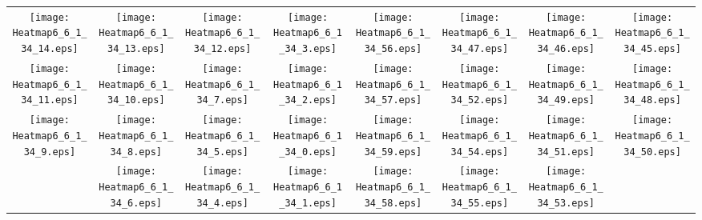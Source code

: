 \documentclass{standalone}
\begin{document}
\begin{tabular}{ *8{c} }
\texttt{[image: Heatmap6\_6\_1\_34\_14.eps]} & \texttt{[image: Heatmap6\_6\_1\_34\_13.eps]} & \texttt{[image: Heatmap6\_6\_1\_34\_12.eps]} & \texttt{[image: Heatmap6\_6\_1\_34\_3.eps]} & \texttt{[image: Heatmap6\_6\_1\_34\_56.eps]} & \texttt{[image: Heatmap6\_6\_1\_34\_47.eps]} & \texttt{[image: Heatmap6\_6\_1\_34\_46.eps]} & \texttt{[image: Heatmap6\_6\_1\_34\_45.eps]} \\
\texttt{[image: Heatmap6\_6\_1\_34\_11.eps]} & \texttt{[image: Heatmap6\_6\_1\_34\_10.eps]} & \texttt{[image: Heatmap6\_6\_1\_34\_7.eps]} & \texttt{[image: Heatmap6\_6\_1\_34\_2.eps]} & \texttt{[image: Heatmap6\_6\_1\_34\_57.eps]} & \texttt{[image: Heatmap6\_6\_1\_34\_52.eps]} & \texttt{[image: Heatmap6\_6\_1\_34\_49.eps]} & \texttt{[image: Heatmap6\_6\_1\_34\_48.eps]} \\
\texttt{[image: Heatmap6\_6\_1\_34\_9.eps]} & \texttt{[image: Heatmap6\_6\_1\_34\_8.eps]} & \texttt{[image: Heatmap6\_6\_1\_34\_5.eps]} & \texttt{[image: Heatmap6\_6\_1\_34\_0.eps]} & \texttt{[image: Heatmap6\_6\_1\_34\_59.eps]} & \texttt{[image: Heatmap6\_6\_1\_34\_54.eps]} & \texttt{[image: Heatmap6\_6\_1\_34\_51.eps]} & \texttt{[image: Heatmap6\_6\_1\_34\_50.eps]} \\
 & \texttt{[image: Heatmap6\_6\_1\_34\_6.eps]} & \texttt{[image: Heatmap6\_6\_1\_34\_4.eps]} & \texttt{[image: Heatmap6\_6\_1\_34\_1.eps]} & \texttt{[image: Heatmap6\_6\_1\_34\_58.eps]} & \texttt{[image: Heatmap6\_6\_1\_34\_55.eps]} & \texttt{[image: Heatmap6\_6\_1\_34\_53.eps]} &  
\end{tabular}
\end{document}
